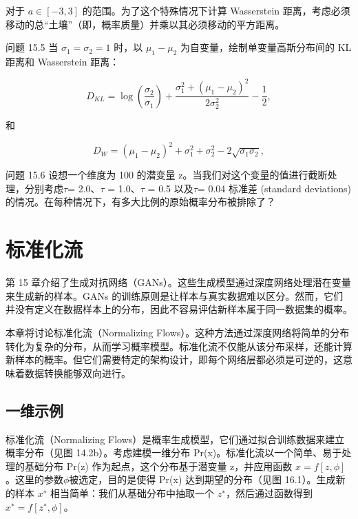 \documentclass[lang=cn,newtx,10pt,scheme=chinese]{elegantbook}
\begin{document}
对于 \(a \in [-3,3]\) 的范围。为了这个特殊情况下计算 Wasserstein 距离，考虑必须移动的总“土壤”（即，概率质量）并乘以其必须移动的平方距离。

问题 15.5 当 \(\sigma_1 = \sigma_2 = 1\) 时，以 \(\mu_1 - \mu_2\) 为自变量，绘制单变量高斯分布间的 KL 距离和 Wasserstein 距离：

\begin{equation}
D_{KL} = \log \left( \frac{\sigma_2}{\sigma_1} \right) + \frac{\sigma_1^2 + (\mu_1 - \mu_2)^2}{2\sigma_2^2} - \frac{1}{2}, 
\end{equation}

和

\begin{equation}
D_{W} = (\mu_1 - \mu_2)^2 + \sigma_1^2 + \sigma_2^2 - 2\sqrt{\sigma_1\sigma_2}, 
\end{equation}

问题 15.6 设想一个维度为 100 的潜变量 z。当我们对这个变量的值进行截断处理，分别考虑\(\tau\)= 2.0、\(\tau\) = 1.0、\(\tau\) = 0.5 以及\(\tau\)= 0.04 标准差 (standard deviations) 的情况。在每种情况下，有多大比例的原始概率分布被排除了？

\chapter{标准化流}

第 15 章介绍了生成对抗网络（GANs）。这些生成模型通过深度网络处理潜在变量来生成新的样本。GANs 的训练原则是让样本与真实数据难以区分。然而，它们并没有定义在数据样本上的分布，因此不容易评估新样本属于同一数据集的概率。

本章将讨论标准化流（Normalizing Flows）。这种方法通过深度网络将简单的分布转化为复杂的分布，从而学习概率模型。标准化流不仅能从该分布采样，还能计算新样本的概率。但它们需要特定的架构设计，即每个网络层都必须是可逆的，这意味着数据转换能够双向进行。

\section{一维示例}
标准化流（Normalizing Flows）是概率生成模型，它们通过拟合训练数据来建立概率分布（见图 14.2b）。考虑建模一维分布 Pr(x)。标准化流以一个简单、易于处理的基础分布 Pr(z) 作为起点，这个分布基于潜变量 z，并应用函数 \(x = f[z,\phi]\)。这里的参数\(\phi\)被选定，目的是使得 Pr(x) 达到期望的分布（见图 16.1）。生成新的样本 \(x^∗\) 相当简单：我们从基础分布中抽取一个 \(z^∗\)，然后通过函数得到 \(x^∗ = f[z^∗, \phi]\)。
\end{document}
